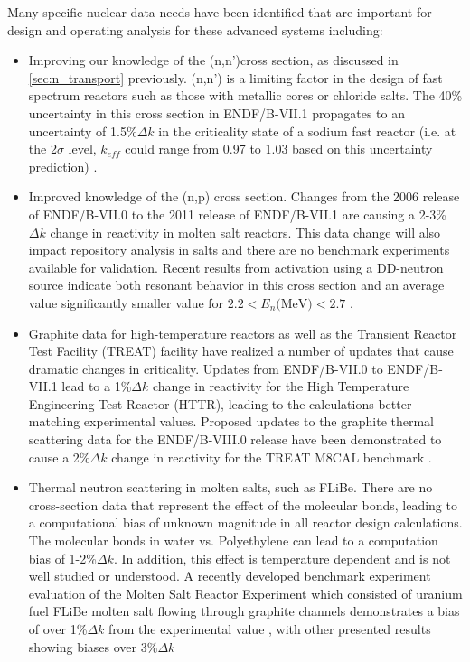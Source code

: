\documentclass[letterpaper]{ar-1col}
\begin{document}
Many specific nuclear data needs have been identified that are important for design and operating analysis for these advanced systems including:
\begin{itemize}
  \item Improving our knowledge of the (n,n')cross section, as discussed in \autoref{sec:n_transport} previously.
  (n,n') is a limiting factor in the design of fast spectrum reactors such as those with metallic cores or chloride salts.
The 40\% uncertainty in this cross section in ENDF/B-VII.1 propagates to an uncertainty of 1.5\%$\Delta k$ in the criticality state of a sodium fast reactor (i.e. at the 2$\sigma$ level, $k_{eff}$ could range from 0.97 to 1.03 based on this uncertainty prediction) \cite{touran2016sensitivities}.
  \item Improved knowledge of the (n,p) cross section.
 Changes from the 2006 release of ENDF/B-VII.0 to the 2011 release of ENDF/B-VII.1 are causing a 2-3\%$\Delta k$ change in reactivity in molten salt reactors.
This data change will also impact repository analysis in salts and there are no benchmark experiments available for validation.
Recent results from activation using a DD-neutron source \cite{Voyles2017} indicate both resonant behavior in this cross section and an average value significantly smaller value for  $2.2 < E_n \text{(MeV)} < 2.7$ \cite{Bat18}.  
  \item Graphite data for high-temperature reactors as well as the Transient Reactor Test Facility (TREAT) facility have realized a number of updates that cause dramatic changes in criticality.
Updates from ENDF/B-VII.0 to ENDF/B-VII.1 lead to a 1\%$\Delta k$ change in reactivity for the High Temperature Engineering Test Reactor (HTTR), leading to the calculations better matching experimental values.
Proposed updates to the graphite thermal scattering data for the ENDF/B-VIII.0 release have been demonstrated to cause a 2\%$\Delta k$ change in reactivity for the TREAT M8CAL benchmark \cite{hawarithermal}.
  \item Thermal neutron scattering in molten salts, such as FLiBe.
There are no cross-section data that represent the effect of the molecular bonds, leading to a computational bias of unknown magnitude in all reactor design calculations.
The molecular bonds in water vs. Polyethylene can lead to a computation bias of 1-2\%$\Delta k$.
 In addition, this effect is temperature dependent and is not well studied or understood.
A recently developed benchmark experiment evaluation of the Molten Salt Reactor Experiment which consisted of uranium fuel FLiBe molten salt flowing through graphite channels demonstrates a bias of over 1\%$\Delta k$ from the experimental value \cite{shenzero}, with other presented results showing biases over 3\%$\Delta k$

\end{itemize}
\end{document}
